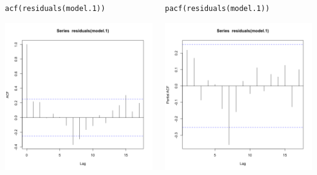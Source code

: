 \documentclass{beamer}
\begin{document}
\begin{frame}[fragile]{}
    \begin{columns}
        \begin{column}{0.5\textwidth}
            \begin{verbatim}
acf(residuals(model.1))
            \end{verbatim}
            \includegraphics[width=\textwidth]{lectures/day_4_GLS/figures/unnamed-chunk-33-1.png}
        \end{column}
        \begin{column}{0.5\textwidth}
            \begin{verbatim}
pacf(residuals(model.1))
            \end{verbatim}
            \includegraphics[width=\textwidth]{lectures/day_4_GLS/figures/unnamed-chunk-34-1.png}

\end{column}
\end{columns}
\end{frame}
\end{document}
